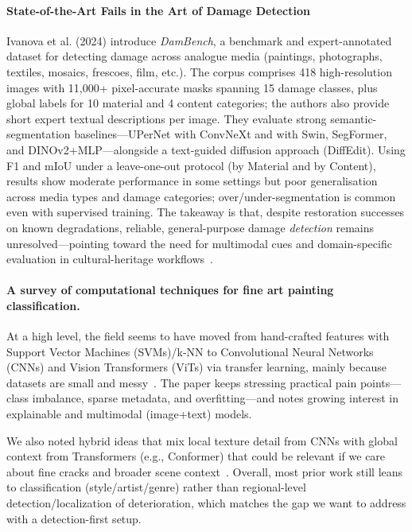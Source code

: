 \documentclass[conference]{IEEEtran}
\begin{document}
\paragraph*{State-of-the-Art Fails in the Art of Damage Detection}
Ivanova et al. (2024) introduce \textit{DamBench}, a benchmark and expert-annotated dataset for detecting damage across analogue media (paintings, photographs, textiles, mosaics, frescoes, film, etc.). The corpus comprises 418 high-resolution images with 11{,}000+ pixel-accurate masks spanning 15 damage classes, plus global labels for 10 material and 4 content categories; the authors also provide short expert textual descriptions per image. They evaluate strong semantic-segmentation baselines—UPerNet with ConvNeXt and with Swin, SegFormer, and DINOv2+MLP—alongside a text-guided diffusion approach (DiffEdit). Using F1 and mIoU under a leave-one-out protocol (by Material and by Content), results show moderate performance in some settings but poor generalisation across media types and damage categories; over/under-segmentation is common even with supervised training. The takeaway is that, despite restoration successes on known degradations, reliable, general-purpose damage \emph{detection} remains unresolved—pointing toward the need for multimodal cues and domain-specific evaluation in cultural-heritage workflows~\cite{ivanova_state---art_2024}.

\medskip
\paragraph*{A survey of computational techniques for fine art painting classification.}
At a high level, the field seems to have moved from hand-crafted features with Support Vector Machines (SVMs)/k-NN to Convolutional Neural Networks (CNNs) and Vision Transformers (ViTs) via transfer learning, mainly because datasets are small and messy~\cite{rathi_survey_2025}. The paper keeps stressing practical pain points—class imbalance, sparse metadata, and overfitting—and notes growing interest in explainable and multimodal (image+text) models.

We also noted hybrid ideas that mix local texture detail from CNNs with global context from Transformers (e.g., Conformer) that could be relevant if we care about fine cracks and broader scene context~\cite{rathi_survey_2025}. Overall, most prior work still leans to classification (style/artist/genre) rather than regional-level detection/localization of deterioration, which matches the gap we want to address with a detection-first setup.
\end{document}
